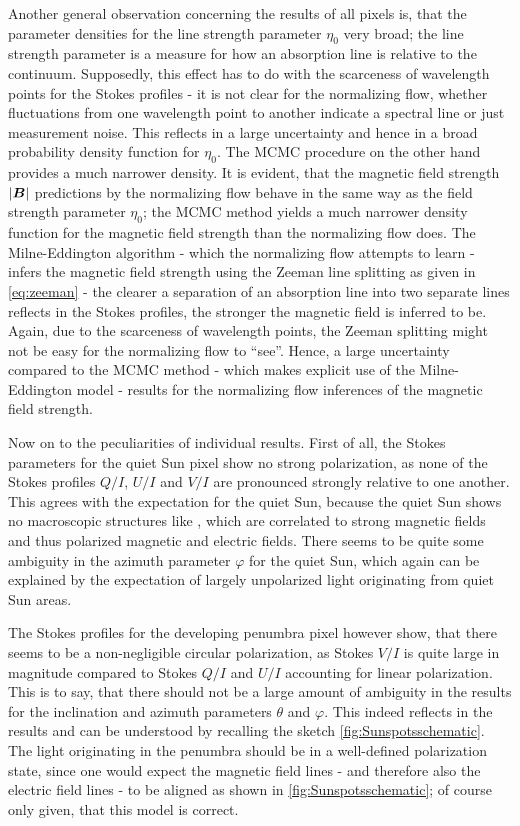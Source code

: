 \documentclass[a4paper,12pt]{report}
\def\lk#1{{\color{black}{#1}}}
\begin{document}
Another general observation concerning the results of all pixels is, that the parameter densities for the line strength parameter $\eta_0$ \lk{are} very broad; the line strength parameter is a measure for how \lk{pronounced} an absorption line is relative to the continuum. Supposedly, this effect has to do with the scarceness of wavelength points for the Stokes profiles - it is not clear for the normalizing flow, whether fluctuations from one wavelength point to another indicate a spectral line or just measurement noise. This reflects in a large uncertainty and hence in a broad probability density function for $\eta_0$. The MCMC procedure on the other hand provides a much narrower density. It is evident, that the magnetic field strength $|\bm{B}|$ predictions by the normalizing flow behave in the same way as the field strength parameter $\eta_0$; the MCMC method yields a much narrower density function for the magnetic field strength than the normalizing flow does. The Milne-Eddington algorithm - which the normalizing flow attempts to learn - infers the magnetic field strength using the Zeeman line splitting as given in \cref{eq:zeeman} - the clearer a separation of an absorption line into two separate lines reflects in the Stokes profiles, the stronger the magnetic field is inferred to be. Again, due to the scarceness of wavelength points, the Zeeman splitting might not be easy for the normalizing flow to ``see''. Hence, a large uncertainty compared to the MCMC method - which makes explicit use of the Milne-Eddington model - results for the normalizing flow inferences of the magnetic field strength.

Now on to the peculiarities of individual results. First of all, the Stokes parameters for the quiet Sun pixel show no strong polarization, as none of the Stokes profiles $Q/I$, $U/I$ and $V/I$ are pronounced strongly relative to one another. This agrees with the expectation for the quiet Sun, because the quiet Sun shows no macroscopic structures like \lk{sunspots}, which are correlated to strong magnetic fields and thus polarized magnetic and electric fields. There seems to be quite some ambiguity in the azimuth parameter $\varphi$ for the quiet Sun, which again can be explained by the expectation of largely unpolarized light originating from quiet Sun areas.

The Stokes profiles for the developing penumbra pixel however show, that there seems to be a non-negligible circular polarization, as Stokes $V/I$ is quite large in magnitude compared to Stokes $Q/I$ and $U/I$ accounting for linear polarization. This is to say, that there should not be a large amount of ambiguity in the results for the inclination and azimuth parameters $\theta$ and $\varphi$. This indeed reflects in the results and can be understood by recalling the \lk{sunspot} sketch \cref{fig:Sunspotsschematic}. The light originating in the penumbra should be in a well-defined polarization state, since one would expect the magnetic field lines - and therefore also the electric field lines - to be aligned as shown in \cref{fig:Sunspotsschematic}; of course only given, that this \lk{sunspot} model is correct.
\end{document}
